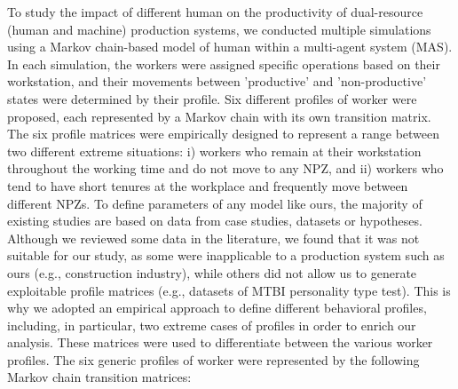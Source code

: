 \documentclass[review,12pt, 3p, times]{elsarticle}
\begin{document}
To study the impact of different human  on the productivity of dual-resource (human and machine) production systems, we conducted multiple simulations using a Markov chain-based model of human  within a multi-agent system (MAS). In each simulation, the workers were assigned specific operations based on their workstation, and their movements between 'productive' and 'non-productive' states were determined by their  profile. Six different profiles of worker  were proposed, each represented by a Markov chain with its own transition matrix. The six profile matrices were empirically designed to represent a range between two different extreme situations: i) workers who remain at their workstation throughout the working time and do not move to any NPZ, and ii) workers who tend to have short tenures at the workplace and frequently move between different NPZs. 
To define  parameters of any model like ours, the majority of existing studies are based on data from case studies, datasets or hypotheses. Although we reviewed some data in the literature, we found that it was not suitable for our study, as some were inapplicable to a production system such as ours (e.g., construction industry), while others did not allow us  to generate exploitable profile matrices (e.g., datasets of MTBI personality type test). This is why we adopted an empirical approach to define different behavioral profiles, including, in particular, two extreme cases of profiles in order to enrich our analysis. These matrices were used to differentiate between the various worker profiles. The six generic profiles of worker  were represented by the following Markov chain transition matrices:
\end{document}
